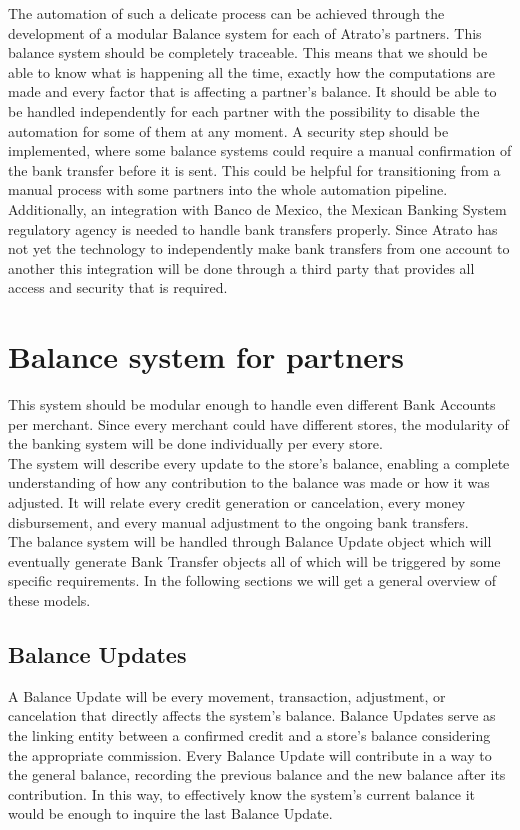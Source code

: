 The automation of such a delicate process can be achieved through the development of a modular Balance system for each of Atrato’s partners. This balance system should be completely traceable. This means that we should be able to know what is happening all the time, exactly how the computations are made and every factor that is affecting a partner’s balance. It should be able to be handled independently for each partner with the possibility to disable the automation for some of them at any moment. A security step should be implemented, where some balance systems could require a manual confirmation of the bank transfer before it is sent. This could be helpful for transitioning from a manual process with some partners into the whole automation pipeline. \\

Additionally, an integration with Banco de Mexico, the Mexican Banking System regulatory agency is needed to handle bank transfers properly. Since Atrato has not yet the technology to independently make bank transfers from one account to another this integration will be done through a third party that provides all access and security that is required.

\section{Balance system for partners}
This system should be modular enough to handle even different Bank Accounts per merchant. Since every merchant could have different stores, the modularity of the banking system will be done individually per every store.\\

The system will describe every update to the store’s balance, enabling a complete understanding of how any contribution to the balance was made or how it was adjusted. It will relate every credit generation or cancelation, every money disbursement, and every manual adjustment to the ongoing bank transfers.\\

The balance system will be handled through Balance Update object which will eventually generate Bank Transfer objects all of which will be triggered by some specific requirements. In the following sections we will get a general overview of these models. 

\subsection{Balance Updates}
A Balance Update will be every movement, transaction, adjustment, or cancelation that directly affects the system’s balance. Balance Updates serve as the linking entity between a confirmed credit and a store’s balance considering the appropriate commission. Every Balance Update will contribute in a way to the general balance, recording the previous balance and the new balance after its contribution. In this way, to effectively know the system’s current balance it would be enough to inquire the last Balance Update.\\

